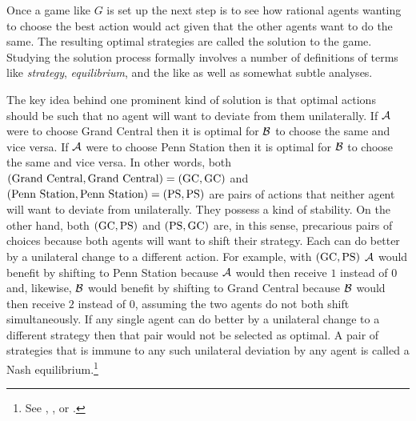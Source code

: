 Once a game like $G$ is set up the next step is to see how rational agents wanting to choose the best action would act given that the other agents want to do the same. The resulting optimal strategies are called the solution to the game. Studying the solution process formally involves a number of definitions of terms like \emph{strategy}, \emph{equilibrium}, and the like as well as somewhat subtle analyses. 


The key idea behind one prominent kind of solution is that optimal actions should be such that no agent will want to deviate from them unilaterally. If $\cal A$ were to choose Grand Central then it is optimal for $\cal B$ to choose the same and vice versa. If $\cal A$ were to choose Penn Station then it is optimal for $\cal B$ to choose the same and vice versa. In other words, both $(\hbox{Grand Central}, \hbox{Grand Central}) = (\hbox{GC}, \hbox{GC})$ and $(\hbox{Penn Station}, \hbox{Penn Station}) = (\hbox{PS}, \hbox{PS})$ are pairs of actions that neither agent will want to deviate from unilaterally. They possess a kind of stability. On the other hand, both $(\hbox{GC}, \hbox{PS})$ and $(\hbox{PS}, \hbox{GC})$ are, in this sense, precarious pairs of choices because both agents will want to shift their strategy. Each can do better by a unilateral change to a different action. For example, with $(\hbox{GC}, \hbox{PS})$ $\cal A$ would benefit by shifting to Penn Station because $\cal A$ would then receive $1$ instead of $0$ and, likewise, $\cal B$ would benefit by shifting to Grand Central because $\cal B$ would then receive $2$ instead of $0$, assuming the two agents do not both shift simultaneously. If any single agent can do better by a unilateral change to a different strategy then that pair would not be selected as optimal. A pair of strategies that is immune to any such unilateral deviation by any agent is called a Nash equilibrium.\footnote{See \citet{nash:ncg}, \citet[Chapter~3]{myerson:gt}, \citet[Chapter~9]{watson:s} or \citet[78]{parikh:le}.} 


